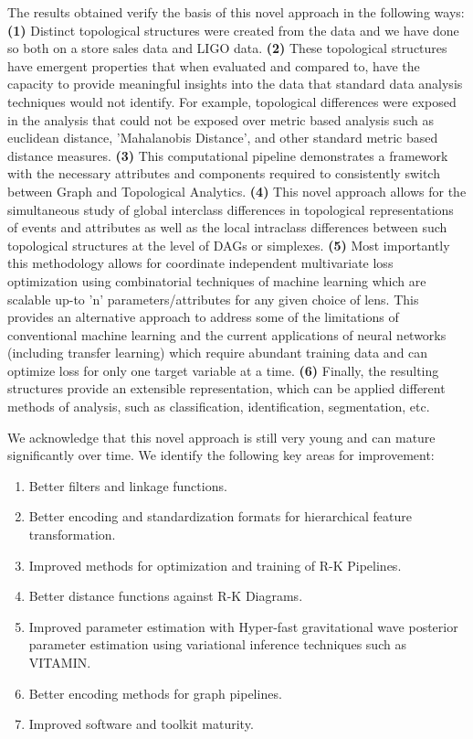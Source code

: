 The results obtained verify the basis of this novel approach in the following ways: \textbf{(1)} Distinct topological structures were created from the data and we have done so both on a store sales data and LIGO data. \textbf{(2)} These topological structures have emergent properties that when evaluated and compared to, have the capacity to provide meaningful insights into the data that standard data analysis techniques would not identify. For example, topological differences were exposed in the analysis that could not be exposed over metric based analysis such as euclidean distance, 'Mahalanobis Distance', and other standard metric based distance measures. \textbf{(3)} This computational pipeline demonstrates a framework with the necessary attributes and components required to consistently switch between Graph and Topological Analytics.  \textbf{(4)} This novel approach allows for the simultaneous study of global interclass differences in topological representations of events and attributes as well as the local intraclass differences between such topological structures at the level of DAGs or simplexes. \textbf{(5)} Most importantly this methodology allows for coordinate independent multivariate loss optimization using combinatorial techniques of machine learning which are scalable up-to 'n' parameters/attributes for any given choice of lens. This provides an alternative approach to address some of the limitations of  conventional machine learning and the current applications of neural networks (including transfer learning) which require abundant training data and can optimize loss for only one target variable at a time. \textbf{(6)} Finally, the resulting structures provide an extensible representation, which can be applied different methods of analysis, such as classification, identification, segmentation, etc.

We acknowledge that this novel approach is still very young and can mature significantly over time. We identify the following key areas for improvement:

\begin{enumerate}
    \item{Better filters and linkage functions.}
    \item{Better encoding and standardization formats for hierarchical feature transformation.}
    \item{Improved methods for optimization and training of R-K Pipelines.}
    \item{Better distance functions against R-K Diagrams.}
    \item{Improved parameter estimation with Hyper-fast gravitational wave posterior parameter estimation using variational inference techniques such as VITAMIN.}
    \item{Better encoding methods for graph pipelines.}
    \item{Improved software and toolkit maturity.}
\end{enumerate}


